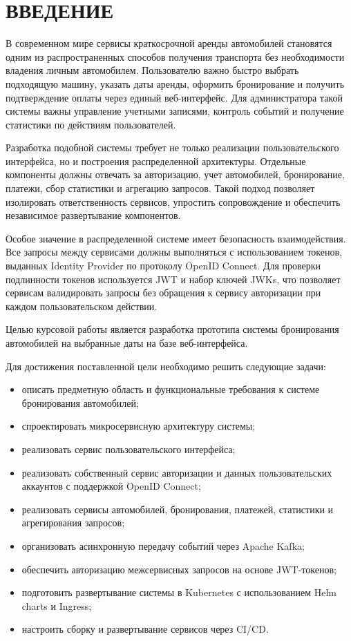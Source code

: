 \maketableofcontents

\chapter*{ВВЕДЕНИЕ}

В современном мире сервисы краткосрочной аренды автомобилей становятся одним из распространенных способов получения транспорта без необходимости владения личным автомобилем. Пользователю важно быстро выбрать подходящую машину, указать даты аренды, оформить бронирование и получить подтверждение оплаты через единый веб-интерфейс. Для администратора такой системы важны управление учетными записями, контроль событий и получение статистики по действиям пользователей.

Разработка подобной системы требует не только реализации пользовательского интерфейса, но и построения распределенной архитектуры. Отдельные компоненты должны отвечать за авторизацию, учет автомобилей, бронирование, платежи, сбор статистики и агрегацию запросов. Такой подход позволяет изолировать ответственность сервисов, упростить сопровождение и обеспечить независимое развертывание компонентов.

Особое значение в распределенной системе имеет безопасность взаимодействия. Все запросы между сервисами должны выполняться с использованием токенов, выданных Identity Provider по протоколу OpenID Connect. Для проверки подлинности токенов используется JWT и набор ключей JWKs, что позволяет сервисам валидировать запросы без обращения к сервису авторизации при каждом пользовательском действии.

Целью курсовой работы является разработка прототипа системы бронирования автомобилей на выбранные даты на базе веб-интерфейса.

Для достижения поставленной цели необходимо решить следующие задачи:

\begin{itemize}
  \item описать предметную область и функциональные требования к системе бронирования автомобилей;
  \item спроектировать микросервисную архитектуру системы;
  \item реализовать сервис пользовательского интерфейса;
  \item реализовать собственный сервис авторизации и данных пользовательских аккаунтов с поддержкой OpenID Connect;
  \item реализовать сервисы автомобилей, бронирования, платежей, статистики и агрегирования запросов;
  \item организовать асинхронную передачу событий через Apache Kafka;
  \item обеспечить авторизацию межсервисных запросов на основе JWT-токенов;
  \item подготовить развертывание системы в Kubernetes с использованием Helm charts и Ingress;
  \item настроить сборку и развертывание сервисов через CI/CD.
\end{itemize}
